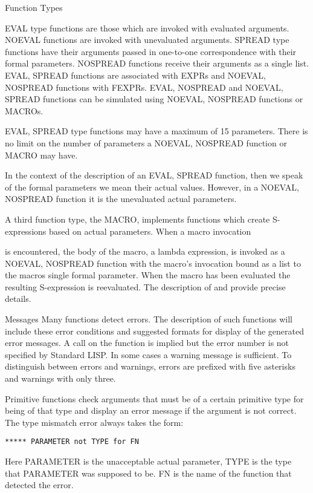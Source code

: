 \begin{Introduction}{Function Types}

EVAL  type functions  are  those  which are  invoked  with  evaluated
arguments.  NOEVAL functions are invoked with  unevaluated arguments.
SPREAD  type functions  have  their arguments  passed  in  one-to-one
correspondence  with their  formal parameters.    NOSPREAD  functions
receive their  arguments as a  single list.   EVAL, SPREAD  functions
are  associated  with  EXPRs  and  NOEVAL,  NOSPREAD  functions  with
FEXPRs.     EVAL,  NOSPREAD  and  NOEVAL,  SPREAD  functions  can  be
simulated using NOEVAL, NOSPREAD functions or MACROs.

EVAL, SPREAD  type functions  may have  a maximum  of 15  parameters.
There is  no limit  on the number  of parameters  a NOEVAL,  NOSPREAD
function or MACRO may have.

In the context of  the description of an EVAL, SPREAD function,  then
we  speak of  the  formal parameters  we  mean their  actual  values.
However, in a NOEVAL, NOSPREAD function it is the  unevaluated actual
parameters.

A third function  type, the MACRO, implements functions which  create
S-expressions based  on actual parameters.   When a macro  invocation

is  encountered, the  body  of the  macro,  a lambda  expression,  is
invoked as  a NOEVAL, NOSPREAD function  with the macro's  invocation
bound as  a list to  the macros single  formal parameter.   When  the
macro has been  evaluated the resulting S-expression is  reevaluated.
The  description of   and  provide  precise
details.
\end{Introduction}

\begin{Introduction}{Messages}
Many functions  detect errors.    The description  of such  functions
will  include  these  error  conditions  and  suggested  formats  for
display  of the  generated  error messages.    A  call on  the  
function  is  implied  but the  error  number  is  not  specified  by
Standard LISP.  In some cases a  warning message is  sufficient.   To
distinguish between  errors and  warnings, errors  are prefixed  with
five asterisks and warnings with only three.

Primitive  functions  check  arguments that  must  be  of  a  certain
primitive type for  being of that type  and display an error  message
if the  argument is  not correct.    The type  mismatch error  always
takes the form:
\begin{verbatim}
***** PARAMETER not TYPE for FN
\end{verbatim}

Here PARAMETER  is the  unacceptable actual  parameter,  TYPE is  the
type that  PARAMETER was  supposed to  be.   FN  is the  name of  the
function that detected the error.
\end{Introduction}

